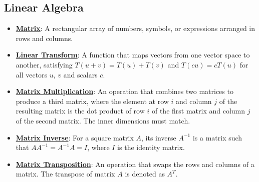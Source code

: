 \documentclass{article}%
\begin{document}
\subsection{Linear Algebra}%
\label{subsec:LinearAlgebra}%
\begin{itemize}[leftmargin=*]%
\item \href{https://purdue.brightspace.com/d2l/common/assets/pdfjs-d2l-dist/1.0.14-legacy/web/viewer.html?file=\%2Fcontent\%2Fenforced\%2F1095467-wl.202510.CS.24300.001\%2F04L1-Linear Algebra Primer.pdf\%3Fou\%3D1095467\&lang=en-us\&container=d2l-fileviewer-rendered-pdf\&fullscreen=d2l-fileviewer-rendered-pdf-dialog\&height=667#page=4}{\textbf{Matrix}}: A rectangular array of numbers, symbols, or expressions arranged in rows and columns.%
\item \href{https://purdue.brightspace.com/d2l/common/assets/pdfjs-d2l-dist/1.0.14-legacy/web/viewer.html?file=\%2Fcontent\%2Fenforced\%2F1095467-wl.202510.CS.24300.001\%2F04L1-Linear Algebra Primer.pdf\%3Fou\%3D1095467\&lang=en-us\&container=d2l-fileviewer-rendered-pdf\&fullscreen=d2l-fileviewer-rendered-pdf-dialog\&height=667#page=5}{\textbf{Linear Transform}}: A function that maps vectors from one vector space to another, satisfying $T(u + v) = T(u) + T(v)$ and $T(cu) = cT(u)$ for all vectors $u$, $v$ and scalars $c$.%
\item \href{https://purdue.brightspace.com/d2l/common/assets/pdfjs-d2l-dist/1.0.14-legacy/web/viewer.html?file=\%2Fcontent\%2Fenforced\%2F1095467-wl.202510.CS.24300.001\%2F04L1-Linear Algebra Primer.pdf\%3Fou\%3D1095467\&lang=en-us\&container=d2l-fileviewer-rendered-pdf\&fullscreen=d2l-fileviewer-rendered-pdf-dialog\&height=667#page=14}{\textbf{Matrix Multiplication}}: An operation that combines two matrices to produce a third matrix, where the element at row $i$ and column $j$ of the resulting matrix is the dot product of row $i$ of the first matrix and column $j$ of the second matrix. The inner dimensions must match.%
\item \href{https://purdue.brightspace.com/d2l/common/assets/pdfjs-d2l-dist/1.0.14-legacy/web/viewer.html?file=\%2Fcontent\%2Fenforced\%2F1095467-wl.202510.CS.24300.001\%2F04L1-Linear Algebra Primer.pdf\%3Fou\%3D1095467\&lang=en-us\&container=d2l-fileviewer-rendered-pdf\&fullscreen=d2l-fileviewer-rendered-pdf-dialog\&height=667#page=10}{\textbf{Matrix Inverse}}: For a square matrix $A$, its inverse $A^{-1}$ is a matrix such that $AA^{-1} = A^{-1}A = I$, where $I$ is the identity matrix.%
\item \href{https://purdue.brightspace.com/d2l/common/assets/pdfjs-d2l-dist/1.0.14-legacy/web/viewer.html?file=\%2Fcontent\%2Fenforced\%2F1095467-wl.202510.CS.24300.001\%2F04L1-Linear Algebra Primer.pdf\%3Fou\%3D1095467\&lang=en-us\&container=d2l-fileviewer-rendered-pdf\&fullscreen=d2l-fileviewer-rendered-pdf-dialog\&height=667#page=16}{\textbf{Matrix Transposition}}: An operation that swaps the rows and columns of a matrix. The transpose of matrix $A$ is denoted as $A^T$.%

\end{itemize}
\end{document}
